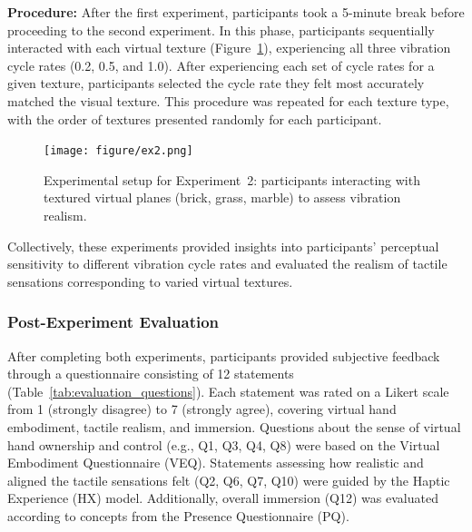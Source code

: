 \documentclass[graybox]{svmult}
\begin{document}
\textbf{Procedure:} After the first experiment, participants took a 5-minute break before proceeding to the second experiment. In this phase, participants sequentially interacted with each virtual texture (Figure~\ref{fig:experiment2_setup}), experiencing all three vibration cycle rates (0.2, 0.5, and 1.0). After experiencing each set of cycle rates for a given texture, participants selected the cycle rate they felt most accurately matched the visual texture. This procedure was repeated for each texture type, with the order of textures presented randomly for each participant.

\begin{figure}[H]
	\centering
	\texttt{[image: figure/ex2.png]}%
	\caption{Experimental setup for Experiment~2: participants interacting with textured virtual planes (brick, grass, marble) to assess vibration realism.}\label{fig:experiment2_setup}
\end{figure}

Collectively, these experiments provided insights into participants' perceptual sensitivity to different vibration cycle rates and evaluated the realism of tactile sensations corresponding to varied virtual textures.

\subsubsection{Post-Experiment Evaluation}
After completing both experiments, participants provided subjective feedback through a questionnaire consisting of 12 statements (Table~\ref{tab:evaluation_questions}). Each statement was rated on a Likert scale from 1 (strongly disagree) to 7 (strongly agree), covering virtual hand embodiment, tactile realism, and immersion. Questions about the sense of virtual hand ownership and control (e.g., Q1, Q3, Q4, Q8) were based on the Virtual Embodiment Questionnaire (VEQ). Statements assessing how realistic and aligned the tactile sensations felt (Q2, Q6, Q7, Q10) were guided by the Haptic Experience (HX) model. Additionally, overall immersion (Q12) was evaluated according to concepts from the Presence Questionnaire (PQ).
\end{document}
